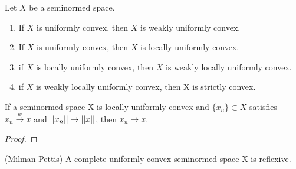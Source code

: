 \begin{prop}
    \label{prop:degreesofconvexity}
    Let $X$ be a seminormed space. 
    \begin{enumerate}
        \item If $X$ is uniformly convex, then $X$ is weakly uniformly convex. 
        \item If $X$ is uniformly convex, then $X$ is locally uniformly convex. 
        \item if $X$ is locally uniformly convex, then $X$ is weakly locally uniformly convex. 
        \item if $X$ is weakly locally uniformly convex, then X is strictly convex. 
    \end{enumerate} 
\end{prop} 
\begin{prop}
    If a seminormed space X is locally uniformly convex and $\{x_n\} \subset X$ satisfies $x_n \overset{w}{\to} x$ and $\left|\left| x_n \right|\right| \to \left|\left| x \right|\right|$, then $x_n \to x$. 
    \begin{proof}
    \end{proof} 
\end{prop} 
\begin{thm} (Milman Pettis)
    A complete uniformly convex seminormed space X is reflexive. 
\end{thm} 


